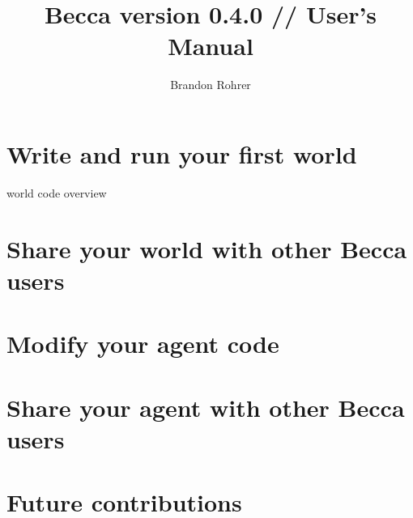 \documentclass[12pt,oneside]{book}
\begin{document}
\title{Becca version 0.4.0 // User's Manual}
\author{Brandon Rohrer}

\maketitle
\tableofcontents
\newpage

\addtolength{\parskip}{\baselineskip}

\setcounter{tocdepth}{0}



\chapter{Write and run your first world}
world code overview

\chapter{Share your world with other Becca users}

\chapter{Modify your agent code}

\chapter{Share your agent with other Becca users}




\chapter{Future contributions}


%
%
\end{document}
